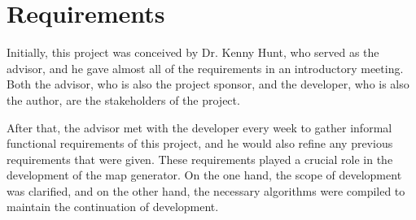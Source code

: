 \section{Requirements}
\label{sec:Requirements}
Initially, this project was conceived by Dr. Kenny Hunt, who served as the advisor, and he gave almost all of the requirements in an introductory meeting. Both the advisor, who is also the project sponsor, and the developer, who is also the author, are the stakeholders of the project.

After that, the advisor met with the developer every week to gather informal functional requirements of this project, and he would also refine any previous requirements that were given. These requirements played a crucial role in the development of the map generator. On the one hand, the scope of development was clarified, and on the other hand, the necessary algorithms were compiled to maintain the continuation of development.

